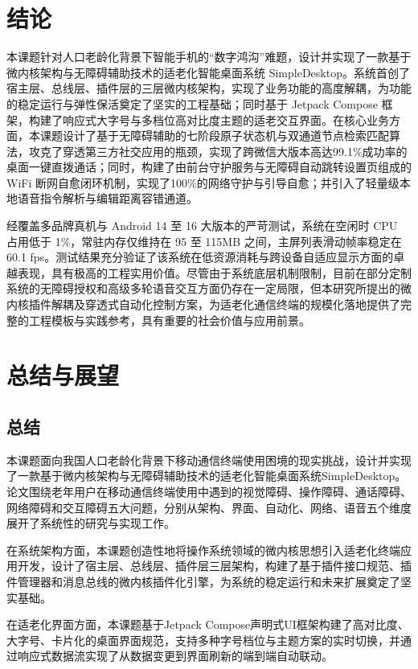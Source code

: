 \chapter{结论}

本课题针对人口老龄化背景下智能手机的“数字鸿沟”难题，设计并实现了一款基于微内核架构与无障碍辅助技术的适老化智能桌面系统 SimpleDesktop。系统首创了宿主层、总线层、插件层的三层微内核架构，实现了业务功能的高度解耦，为功能的稳定运行与弹性保活奠定了坚实的工程基础；同时基于 Jetpack Compose 框架，构建了响应式大字号与多档位高对比度主题的适老交互界面。在核心业务方面，本课题设计了基于无障碍辅助的七阶段原子状态机与双通道节点检索匹配算法，攻克了穿透第三方社交应用的瓶颈，实现了跨微信大版本高达99.1\%成功率的桌面一键直拨通话；同时，构建了由前台守护服务与无障碍自动跳转设置页组成的 WiFi 断网自愈闭环机制，实现了100\%的网络守护与引导自愈；并引入了轻量级本地语音指令解析与编辑距离容错通道。

经覆盖多品牌真机与 Android 14 至 16 大版本的严苛测试，系统在空闲时 CPU 占用低于 1\%，常驻内存仅维持在 95 至 115MB 之间，主屏列表滑动帧率稳定在 60.1 fps。测试结果充分验证了该系统在低资源消耗与跨设备自适应显示方面的卓越表现，具有极高的工程实用价值。尽管由于系统底层机制限制，目前在部分定制系统的无障碍授权和高级多轮语音交互方面仍存在一定局限，但本研究所提出的微内核插件解耦及穿透式自动化控制方案，为适老化通信终端的规模化落地提供了完整的工程模板与实践参考，具有重要的社会价值与应用前景。


\iffalse

\chapter{总结与展望}

\section{总结}
本课题面向我国人口老龄化背景下移动通信终端使用困境的现实挑战，设计并实现了一款基于微内核架构与无障碍辅助技术的适老化智能桌面系统SimpleDesktop。论文围绕老年用户在移动通信终端使用中遇到的视觉障碍、操作障碍、通话障碍、网络障碍和交互障碍五大问题，分别从架构、界面、自动化、网络、语音五个维度展开了系统性的研究与实现工作。

在系统架构方面，本课题创造性地将操作系统领域的微内核思想引入适老化终端应用开发，设计了宿主层、总线层、插件层三层架构，构建了基于插件接口规范、插件管理器和消息总线的微内核插件化引擎，为系统的稳定运行和未来扩展奠定了坚实基础。

在适老化界面方面，本课题基于Jetpack Compose声明式UI框架构建了高对比度、大字号、卡片化的桌面界面规范，支持多种字号档位与主题方案的实时切换，并通过响应式数据流实现了从数据变更到界面刷新的端到端自动联动。

